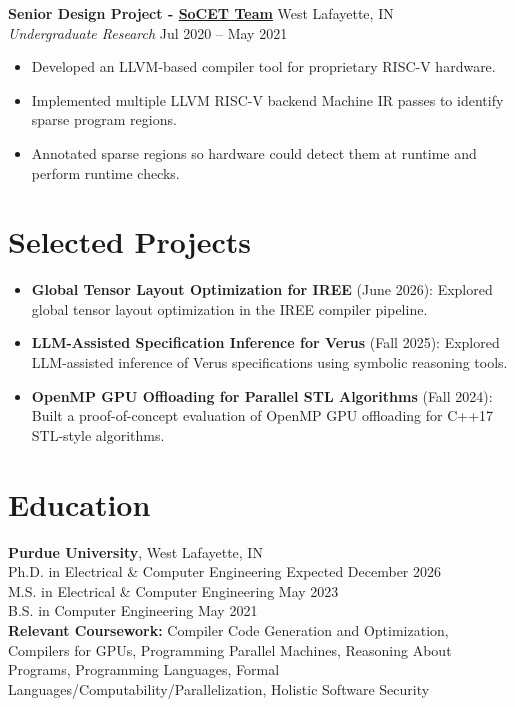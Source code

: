 \documentclass[10pt,letterpaper]{article}
\begin{document}
\textbf{Senior Design Project - \textcolor{ultramarineblue}{\href{https://engineering.purdue.edu/SoC-Team}{SoCET Team}}} \hfill West Lafayette, IN\\
\textit{Undergraduate Research} \hfill Jul 2020 -- May 2021
\begin{itemize}
    \item Developed an LLVM-based compiler tool for proprietary RISC-V hardware.
    \item Implemented multiple LLVM RISC-V backend Machine IR passes to identify sparse program regions.
    \item Annotated sparse regions so hardware could detect them at runtime and perform runtime checks.
\end{itemize}

\section*{Selected Projects}
\begin{itemize}[leftmargin=1em]
  \item \textbf{Global Tensor Layout Optimization for IREE} (June 2026): Explored global tensor layout optimization in the IREE compiler pipeline.
  \item \textbf{LLM-Assisted Specification Inference for Verus} (Fall 2025): Explored LLM-assisted inference of Verus specifications using symbolic reasoning tools.
  \item \textbf{OpenMP GPU Offloading for Parallel STL Algorithms} (Fall 2024): Built a proof-of-concept evaluation of OpenMP GPU offloading for C++17 STL-style algorithms.
\end{itemize}

\section*{Education}
\textbf{Purdue University}, West Lafayette, IN\\
Ph.D. in Electrical \& Computer Engineering \hfill Expected December 2026\\
M.S. in Electrical \& Computer Engineering \hfill May 2023\\
B.S. in Computer Engineering \hfill May 2021\\
\textbf{Relevant Coursework:} Compiler Code Generation and Optimization, Compilers for GPUs, Programming Parallel Machines, Reasoning About Programs, Programming Languages, Formal Languages/Computability/Parallelization, Holistic Software Security
\end{document}
